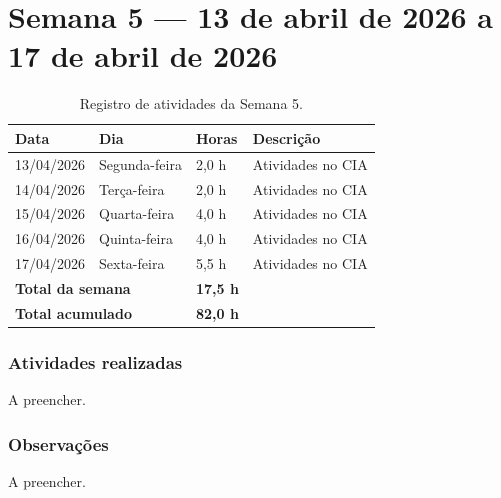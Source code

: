 
\section{Semana 5 --- 13 de abril de 2026 a 17 de abril de 2026}

\begin{table}[H]
\centering
\caption{Registro de atividades da Semana 5.}
\begin{tabular}{llll}
\toprule
\textbf{Data} & \textbf{Dia} & \textbf{Horas} & \textbf{Descrição} \\
\midrule
13/04/2026 & Segunda-feira & 2,0 h & Atividades no CIA \\
14/04/2026 & Terça-feira & 2,0 h & Atividades no CIA \\
15/04/2026 & Quarta-feira & 4,0 h & Atividades no CIA \\
16/04/2026 & Quinta-feira & 4,0 h & Atividades no CIA \\
17/04/2026 & Sexta-feira & 5,5 h & Atividades no CIA \\
\midrule
\multicolumn{2}{l}{\textbf{Total da semana}} & \textbf{17,5 h} & \\
\multicolumn{2}{l}{\textbf{Total acumulado}} & \textbf{82,0 h} & \\
\bottomrule
\end{tabular}
\end{table}

\subsubsection*{Atividades realizadas}

A preencher.

\subsubsection*{Observações}

A preencher.
